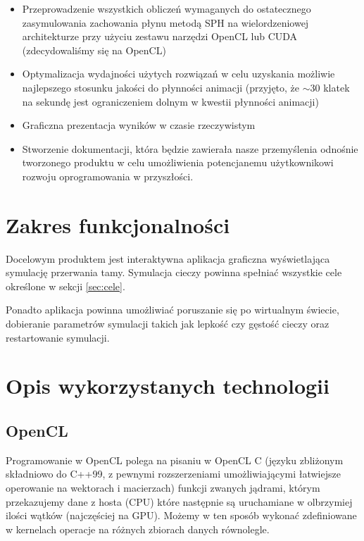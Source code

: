 \documentclass[polish, 12pt]{aghthesis}
\begin{document}
	\begin{itemize}
	
		\item Przeprowadzenie wszystkich obliczeń wymaganych do ostatecznego zasymulowania zachowania płynu metodą SPH na wielordzeniowej architekturze przy użyciu zestawu narzędzi OpenCL lub CUDA (zdecydowaliśmy się na OpenCL)
				
		\item Optymalizacja wydajności użytych rozwiązań w celu uzyskania możliwie najlepszego stosunku jakości do płynności animacji (przyjęto, że $\sim 30$ klatek na sekundę jest ograniczeniem dolnym w kwestii płynności animacji)
		
		\item Graficzna prezentacja wyników w czasie rzeczywistym
	
		\item Stworzenie dokumentacji, która będzie zawierała nasze przemyślenia odnośnie tworzonego produktu w celu umożliwienia potencjanemu użytkownikowi rozwoju oprogramowania w przyszłości.
		
	\end{itemize}
	
\section{Zakres funkcjonalności}
	
	Docelowym produktem jest interaktywna aplikacja graficzna wyświetlająca symulację przerwania tamy. Symulacja cieczy powinna spełniać wszystkie cele określone w sekcji \ref{sec:cele}.
	
		Ponadto aplikacja powinna umożliwiać poruszanie się po wirtualnym świecie, dobieranie parametrów symulacji takich jak lepkość czy gęstość cieczy oraz restartowanie symulacji.
	
\section{Opis wykorzystanych technologii}

\subsection{OpenCL}
			Programowanie w OpenCL polega na pisaniu w OpenCL C (języku zbliżonym składniowo do C++99, z pewnymi rozszerzeniami umożliwiającymi łatwiejsze operowanie na wektorach i macierzach) funkcji zwanych jądrami, którym przekazujemy dane z hosta (CPU) które następnie są uruchamiane w olbrzymiej ilości wątków (najczęściej na GPU). Możemy w ten sposób wykonać zdefiniowane w kernelach operacje na różnych zbiorach danych równolegle. 
			
\end{document}
